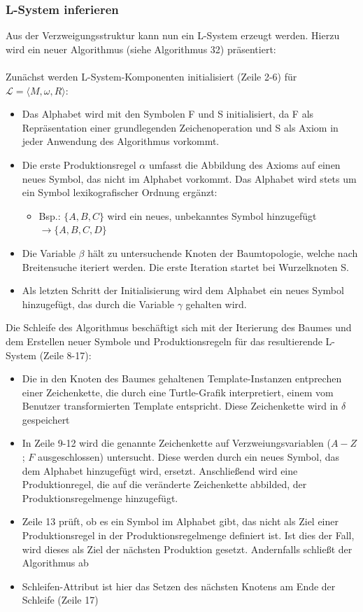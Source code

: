 \subsubsection*{L-System inferieren}
Aus der Verzweigungsstruktur kann nun ein L-System erzeugt werden.
Hierzu wird ein neuer Algorithmus (siehe Algorithmus 32) präsentiert:\\~\\
Zunächst werden L-System-Komponenten initialisiert (Zeile 2-6) für $\mathcal{L}=\langle M,\omega,R \rangle$:
\begin{itemize}
    \item Das Alphabet wird mit den Symbolen F und S initialisiert, da F als Repräsentation einer grundlegenden
    Zeichenoperation und S als Axiom in jeder Anwendung des Algorithmus vorkommt.
    \item Die erste Produktionsregel $\alpha$ umfasst die Abbildung des Axioms auf einen neues Symbol, das nicht im Alphabet
    vorkommt.
    Das Alphabet wird stets um ein Symbol lexikografischer Ordnung ergänzt:
    \begin{itemize}
        \item Bsp.: $\{A,B,C\}$ wird ein neues, unbekanntes Symbol hinzugefügt $\rightarrow \{A,B,C,D\}$
    \end{itemize}
    \item Die Variable $\beta$ hält zu untersuchende Knoten der Baumtopologie, welche nach Breitensuche iteriert werden.
    Die erste Iteration startet bei Wurzelknoten S.
    \item Als letzten Schritt der Initialisierung wird dem Alphabet ein neues Symbol hinzugefügt, das durch die Variable
    $\gamma$ gehalten wird.
\end{itemize}
Die Schleife des Algorithmus beschäftigt sich mit der Iterierung des Baumes und dem Erstellen neuer Symbole und
Produktionsregeln für das resultierende L-System (Zeile 8-17):
\begin{itemize}
    \item Die in den Knoten des Baumes gehaltenen Template-Instanzen entprechen einer Zeichenkette, die durch eine
    Turtle-Grafik interpretiert, einem vom Benutzer transformierten Template entspricht.
    Diese Zeichenkette wird in $\delta$ gespeichert
    \item In Zeile 9-12 wird die genannte Zeichenkette auf Verzweiungsvariablen ($A-Z$; $F$ ausgeschlossen) untersucht.
    Diese werden durch ein neues Symbol, das dem Alphabet hinzugefügt wird, ersetzt. Anschließend wird eine Produktionregel,
    die auf die veränderte Zeichenkette abbilded, der Produktionsregelmenge hinzugefügt.
    \item Zeile 13 prüft, ob es ein Symbol im Alphabet gibt, das nicht als Ziel einer Produktionsregel in der Produktionsregelmenge
    definiert ist. Ist dies der Fall, wird dieses als Ziel der nächsten Produktion gesetzt.
    Andernfalls schließt der Algorithmus ab
    \item Schleifen-Attribut ist hier das Setzen des nächsten Knotens am Ende der Schleife (Zeile 17)
\end{itemize}

